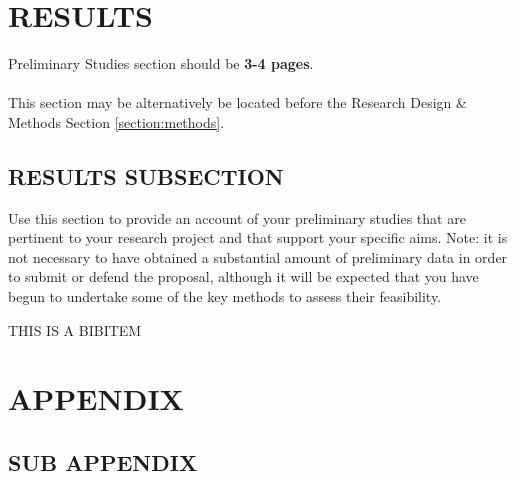 \documentclass[12pt, lettersize]{article}
\begin{document}
\section{RESULTS}
Preliminary Studies section should be \textbf{3-4 pages}. \\\\
This section may be alternatively be located before the Research Design \& Methods Section \ref{section:methods}.

\subsection{RESULTS SUBSECTION}
\noindent Use this section to provide an account of your preliminary studies that are pertinent to your research project
and that support your specific aims. Note: it is not necessary to have obtained a substantial amount of
preliminary data in order to submit or defend the proposal, although it will be expected that you have begun
to undertake some of the key methods to assess their feasibility.

\newpage
% 

\begin{thebibliography}{99} %

THIS IS A BIBITEM

\end{thebibliography}

\newpage
\appendix
\section{APPENDIX}

\subsection{SUB APPENDIX}

\end{document}
